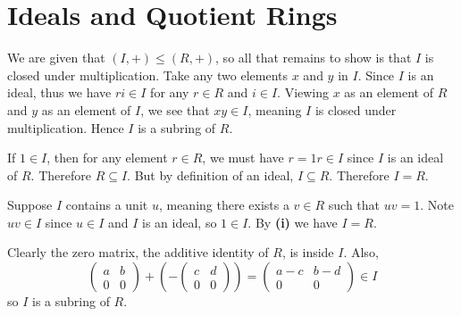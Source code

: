 \section{Ideals and Quotient Rings}
\begin{questions}
    \item We are given that $(I, +) \leq (R,+)$, so all that remains to show is that $I$ is closed under multiplication. Take any two elements $x$ and $y$ in $I$. Since $I$ is an ideal, thus we have $ri \in I$ for any $r \in R$ and $i \in I$. Viewing $x$ as an element of $R$ and $y$ as an element of $I$, we see that $xy \in I$, meaning $I$ is closed under multiplication. Hence $I$ is a subring of $R$.
    
    \item \begin{partquestions}{\roman*}
        \item If $1 \in I$, then for any element $r \in R$, we must have $r = 1r \in I$ since $I$ is an ideal of $R$. Therefore $R \subseteq I$. But by definition of an ideal, $I \subseteq R$. Therefore $I = R$.
        \item Suppose $I$ contains a unit $u$, meaning there exists a $v \in R$ such that $uv = 1$. Note $uv \in I$ since $u \in I$ and $I$ is an ideal, so $1 \in I$. By \textbf{(i)} we have $I = R$.
    \end{partquestions}
    
    \item \begin{partquestions}{\roman*}
        \item Clearly the zero matrix, the additive identity of $R$, is inside $I$. Also,
        \[
            \begin{pmatrix}a&b\\0&0\end{pmatrix} + (-\begin{pmatrix}c&d\\0&0\end{pmatrix}) = \begin{pmatrix}a-c&b-d\\0&0\end{pmatrix} \in I
        \]
        so $I$ is a subring of $R$.


\end{partquestions}
\end{questions}
